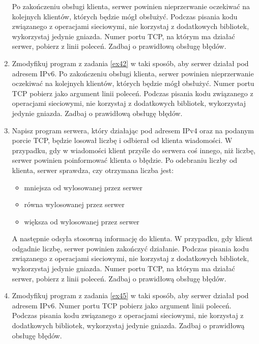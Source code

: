 \documentclass{article}
\begin{document}
\begin{enumerate}[label=\textbf{4.\arabic*}]
\noindent Po zakończeniu obsługi klienta, serwer powinien nieprzerwanie oczekiwać na kolejnych klientów, których będzie mógł obsłużyć. Podczas pisania kodu związanego z operacjami sieciowymi, nie korzystaj z dodatkowych bibliotek, wykorzystaj jedynie gniazda. Numer portu TCP, na którym ma działać serwer, pobierz z linii poleceń. Zadbaj o prawidłową obsługę błędów. 

\item Zmodyfikuj program z zadania \ref{ex42} w taki sposób,  aby serwer działał pod adresem IPv6. Po zakończeniu obsługi klienta, serwer powinien nieprzerwanie oczekiwać na kolejnych klientów, których będzie mógł obsłużyć. Numer portu TCP pobierz jako argument linii poleceń. Podczas pisania kodu związanego z operacjami sieciowymi, nie korzystaj z dodatkowych bibliotek, wykorzystaj jedynie gniazda. Zadbaj o prawidłową obsługę błędów. 

\item \label{ex45} Napisz program serwera, który działając  pod adresem IPv4 oraz na podanym porcie TCP, będzie losował liczbę i odbierał od klienta wiadomości. W przypadku, gdy w wiadomości klient przyśle do serwera coś innego, niż liczbę, serwer powinien poinformować klienta o błędzie. Po odebraniu liczby od klienta, serwer sprawdza, czy otrzymana liczba jest:

\begin{itemize}
\item mniejsza od wylosowanej przez serwer
\item równa wylosowanej przez serwer
\item większa od wylosowanej przez serwer
\end{itemize} 

\noindent A następnie odsyła stosowną informację do klienta. W przypadku, gdy klient odgadnie liczbę, serwer powinien zakończyć działanie.   Podczas pisania kodu związanego z operacjami sieciowymi, nie korzystaj z dodatkowych bibliotek, wykorzystaj jedynie gniazda. Numer portu TCP, na którym ma działać serwer, pobierz z linii poleceń. Zadbaj o prawidłową obsługę błędów. 

\item Zmodyfikuj program z zadania \ref{ex45} w taki sposób,  aby serwer działał pod adresem IPv6.   Numer portu TCP pobierz jako argument linii poleceń. Podczas pisania kodu związanego z operacjami sieciowymi, nie korzystaj z dodatkowych bibliotek, wykorzystaj jedynie gniazda. Zadbaj o prawidłową obsługę błędów.


\end{enumerate}
\end{document}
